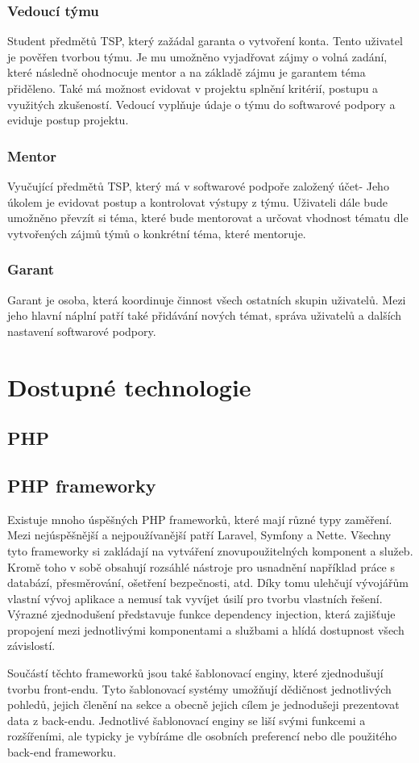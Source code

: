 \documentclass[czech,BP]{thesiskiv}
\begin{document}
	\subsection{Vedoucí týmu}
		\par Student předmětů TSP, který zažádal garanta o vytvoření konta. Tento uživatel je pověřen tvorbou týmu. Je mu umožněno vyjadřovat zájmy o volná zadání, které následně ohodnocuje mentor a na základě zájmu je garantem téma přiděleno. Také má možnost evidovat v projektu splnění kritérií, postupu a využitých zkušeností. Vedoucí vyplňuje údaje o týmu do softwarové podpory a eviduje postup projektu.
	\subsection{Mentor}
		\par Vyučující předmětů TSP, který má v softwarové podpoře založený účet- Jeho úkolem je evidovat postup a kontrolovat výstupy z týmu. Uživateli dále bude umožněno převzít si téma, které bude mentorovat a určovat vhodnost tématu dle vytvořených zájmů týmů o konkrétní téma, které mentoruje.
	\subsection{Garant}
		\par Garant je osoba, která koordinuje činnost všech ostatních skupin uživatelů. Mezi jeho hlavní náplní patří také přidávání nových témat, správa uživatelů a dalších nastavení softwarové podpory.

\chapter{Dostupné technologie}
\section{PHP}
\par
\section{PHP frameworky}
	\par Existuje mnoho úspěšných PHP frameworků, které mají různé typy zaměření. Mezi nejúspěšnější a nejpoužívanější patří Laravel, Symfony a Nette. Všechny tyto frameworky si zakládají na vytváření znovupoužitelných komponent a služeb. Kromě toho v sobě obsahují rozsáhlé nástroje pro usnadnění například práce s databází, přesměrování, ošetření bezpečnosti, atd. Díky tomu ulehčují vývojářům vlastní vývoj aplikace a nemusí tak vyvíjet úsilí pro tvorbu vlastních řešení. Výrazné zjednodušení představuje funkce dependency injection, která zajišťuje propojení mezi jednotlivými komponentami a službami a hlídá dostupnost všech závislostí.
	\par Součástí těchto frameworků jsou také šablonovací enginy, které zjednodušují tvorbu front-endu. Tyto šablonovací systémy umožňují dědičnost jednotlivých pohledů, jejich členění na sekce a obecně jejich cílem je jednodušeji prezentovat data z back-endu. Jednotlivé šablonovací enginy se liší svými funkcemi a rozšířeními, ale typicky je vybíráme dle osobních preferencí nebo dle použitého back-end frameworku.
\end{document}

